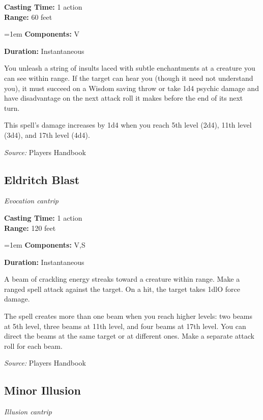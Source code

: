 \documentclass[10pt,twoside,twocolumn]{article}
\begin{document}
\noindent
\textbf{Casting Time:}  1 action\\
\textbf{Range:}  60 feet

\noindent
\hangindent=1em
\textbf{Components:}  V

\noindent
\textbf{Duration:}  Instantaneous\\
\smallskip



You unleash a string of insults laced with subtle enchantments at a creature you can see within range. If the target can hear you (though it need not understand you), it must succeed on a Wisdom saving throw or take 1d4 psychic damage and have disadvantage on the next attack roll it makes before the end of its next turn.

This spell's damage increases by 1d4 when you reach 5th level (2d4), 11th level (3d4), and 17th level (4d4).



\textit{Source:} Players Handbook

\subsection{Eldritch Blast}
\textit{Evocation cantrip}
\smallskip

\noindent
\textbf{Casting Time:}  1 action\\
\textbf{Range:}  120 feet

\noindent
\hangindent=1em
\textbf{Components:}  V,S

\noindent
\textbf{Duration:}  Instantaneous\\
\smallskip



A beam of crackling energy streaks toward a creature within range. Make a ranged spell attack against the target. On a hit, the target takes 1dlO force damage.

The spell creates more than one beam when you reach higher levels: two beams at 5th level, three beams at 11th level, and four beams at 17th level. You can direct the beams at the same target or at different ones. Make a separate attack roll for each beam.



\textit{Source:} Players Handbook

\subsection{Minor Illusion}
\textit{Illusion cantrip}
\smallskip
\end{document}
